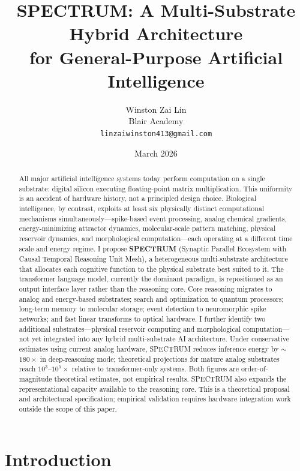 \documentclass[12pt]{article}
\title{\textbf{SPECTRUM: A Multi-Substrate Hybrid Architecture\\
for General-Purpose Artificial Intelligence}}
\author{
    Winston Zai Lin \\
    \small Blair Academy \\
    \small \texttt{linzaiwinston413@gmail.com}
}
\date{March 2026}
\begin{document}
\maketitle

\begin{abstract}
All major artificial intelligence systems today perform computation on a single substrate: digital silicon executing floating-point matrix multiplication. This uniformity is an accident of hardware history, not a principled design choice. Biological intelligence, by contrast, exploits at least six physically distinct computational mechanisms simultaneously---spike-based event processing, analog chemical gradients, energy-minimizing attractor dynamics, molecular-scale pattern matching, physical reservoir dynamics, and morphological computation---each operating at a different time scale and energy regime. I propose \textbf{SPECTRUM} (Synaptic Parallel Ecosystem with Causal Temporal Reasoning Unit Mesh), a heterogeneous multi-substrate architecture that allocates each cognitive function to the physical substrate best suited to it. The transformer language model, currently the dominant paradigm, is repositioned as an output interface layer rather than the reasoning core. Core reasoning migrates to analog and energy-based substrates; search and optimization to quantum processors; long-term memory to molecular storage; event detection to neuromorphic spike networks; and fast linear transforms to optical hardware. I further identify two additional substrates---physical reservoir computing and morphological computation---not yet integrated into any hybrid multi-substrate AI architecture. Under conservative estimates using current analog hardware, SPECTRUM reduces inference energy by $\sim$$180\times$ in deep-reasoning mode; theoretical projections for mature analog substrates reach $10^3$--$10^5\times$ relative to transformer-only systems. Both figures are order-of-magnitude theoretical estimates, not empirical results. SPECTRUM also expands the representational capacity available to the reasoning core. This is a theoretical proposal and architectural specification; empirical validation requires hardware integration work outside the scope of this paper.
\end{abstract}

\section{Introduction}
\end{document}

